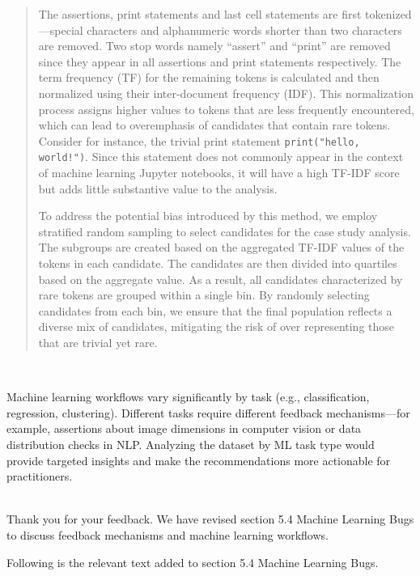 \documentclass[11pt,fleqn]{article}
\newcommand{\eline}{\vspace*{.75\baselineskip}}
\newcommand{\Referee}[1]{\eline \noindent {\bf Reviewer comment #1:} \\}
\newcommand{\Us}{\eline \noindent {\bf Response:}\\}
\newenvironment{revcomment}[1][]
{\Referee{#1}\begin{rcomment}}
{\end{rcomment}}
\begin{document}
\begin{quote}
  The assertions, print statements and last cell statements are first tokenized---special characters and alphanumeric words shorter than two characters are removed. Two stop words namely ``assert'' and ``print'' are removed since they appear in all assertions and print statements respectively. The term frequency (TF) for the remaining tokens is calculated and then normalized using their inter-document frequency (IDF). This normalization process assigns higher values to tokens that are less frequently encountered, which can lead to overemphasis of candidates that contain rare tokens. Consider for instance, the trivial print statement \texttt{print("hello, world!")}. Since this statement does not commonly appear in the context of machine learning Jupyter notebooks, it will have a high TF-IDF score but adds little substantive value to the analysis.

  To address the potential bias introduced by this method, we employ stratified random sampling to select candidates for the case study analysis. The subgroups are created based on the aggregated TF-IDF values of the tokens in each candidate. The candidates are then divided into quartiles based on the aggregate value. As a result, all candidates characterized by rare tokens are grouped within a single bin. By randomly selecting candidates from each bin, we ensure that the final population reflects a diverse mix of candidates, mitigating the risk of over representing those that are trivial yet rare.
\end{quote}

\begin{revcomment}[2.6]
  Machine learning workflows vary significantly by task (e.g., classification, regression, clustering). Different tasks require different feedback mechanisms—for example, assertions about image dimensions in computer vision or data distribution checks in NLP. Analyzing the dataset by ML task type would provide targeted insights and make the recommendations more actionable for practitioners.
\end{revcomment}

\Us Thank you for your feedback. We have revised section 5.4 Machine Learning Bugs to discuss feedback mechanisms and machine learning workflows.

Following is the relevant text added to section 5.4 Machine Learning Bugs.
\end{document}
